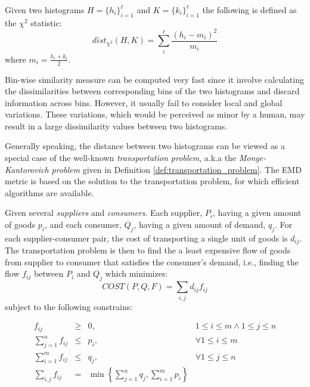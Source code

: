 \begin{definition}
Given two histograms $H=\{h_i\}_{i=1}^{\ell}$ and $K=\{k_i\}_{i=1}^{\ell}$ the following is defined as the $\chi^2$ statistic: 
\begin{equation}
dist_{\chi^2}(H,K)=\sum_{i}^{\ell} \frac{(h_i - m_i)^2}{m_i}
\end{equation}
where $m_i=\frac{h_i+k_i}{2}$.
\end{definition}

\iftoggle{edit-mode}{\hspace{0pt}\marginpar{Drawback of binwise based measures}}{}
Bin-wise similarity measure can be computed very fast since it involve calculating the dissimilarities between corresponding bins of the two histograms and discard information across bins. 
However, it usually fail to consider local and global variations. 
These variations, which would be perceived as minor by a human, may result in a large dissimilarity values between two histograms.

\iftoggle{edit-mode}{\hspace{0pt}\marginpar{The transportation problem}}{}
Generally speaking, the distance between two histograms can be viewed as a special case of the well-known \emph{transportation problem}, a.k.a the \emph{Monge-Kantorovich problem} \cite{rachev1985monge} given in Definition \ref{def:transportation_problem}. 
The EMD metric is based on the solution to the transportation problem, for which efficient algorithms are available.

\begin{definition}
\label{def:transportation_problem}
Given several \emph{suppliers} and \emph{consumers}. 
Each supplier, $P_i$, having a given amount of goods $p_i$, and each consumer, $Q_j$, having a given amount of demand, $q_j$. 
For each supplier-consumer pair, the cost of transporting a single unit of goods is $d_{ij}$. 
The transportation problem is then to find the a least expensive flow of goods from supplier to consumer that satisfies the consumer's demand, i.e., finding the flow $f_{ij}$ between $P_i$ and $Q_j$ which minimizes:
\begin{equation}
COST(P,Q,F)=\sum_{i,j} d_{ij}f_{ij} 
\end{equation}
subject to the following constrains:

\begin{equation}
\begin{array}{lcll}
f_{ij}                       & \geq &0   , & 1\leq i \leq m \wedge 1\leq j \leq n \\
\sum\limits_{j=1}^{n} f_{ij} & \leq & p_i, & \forall 1\leq i \leq m   \\
\sum\limits_{i=1}^{m} f_{ij} & \leq & q_j, & \forall 1\leq j \leq n   \\
\sum\limits_{i,j} f_{ij}     &   =  & \min\left\{ \sum\limits_{j=1}^{n} q_j, \sum\limits_{i=1}^{m} p_i \right\} &
\end{array}
\end{equation}

\end{definition}

